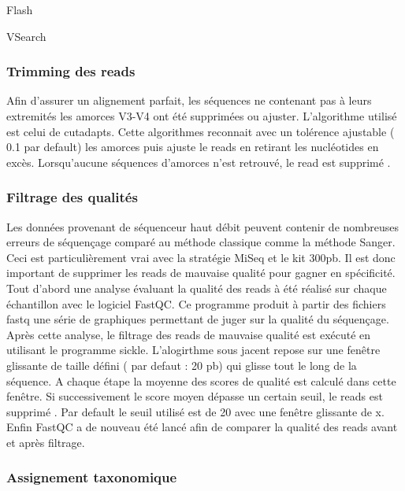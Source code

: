 \documentclass[12pt,a4paper]{article}
\begin{document}
Flash

VSearch

\subsubsection{Trimming des reads}

Afin d’assurer un alignement parfait, les séquences ne contenant pas à leurs extremités les amorces V3-V4 ont été supprimées ou ajuster.
L’algorithme utilisé est celui de cutadapts. Cette algorithmes reconnait avec un tolérence ajustable ( 0.1 par default) les amorces puis ajuste le reads en retirant les nucléotides en excès. Lorsqu’aucune séquences d’amorces n’est retrouvé, le read est supprimé .

\subsubsection{Filtrage des qualités}

Les données provenant de séquenceur haut débit peuvent contenir de nombreuses erreurs de séquençage comparé au méthode classique comme la méthode Sanger. Ceci est particulièrement vrai avec la stratégie MiSeq et le kit 300pb. Il est donc important de supprimer les reads de mauvaise qualité pour gagner en spécificité.
Tout d’abord une analyse évaluant la qualité des reads à été réalisé sur chaque échantillon avec le logiciel FastQC. Ce programme produit à partir des fichiers fastq une série de graphiques permettant de juger sur la qualité du séquençage.
Après cette analyse, le filtrage des reads de mauvaise qualité est exécuté en utilisant le programme sickle. L’alogirthme sous jacent repose sur une fenêtre glissante de taille défini ( par defaut : 20 pb) qui glisse tout le long de la séquence. A chaque étape la moyenne des scores de qualité est calculé dans cette fenêtre. Si successivement le score moyen dépasse un certain seuil, le reads est supprimé . Par default le seuil utilisé est de 20 avec une fenêtre glissante de x.
Enfin FastQC a de nouveau été lancé afin de comparer la qualité des reads avant et après filtrage.

\subsubsection{Assignement taxonomique}
\end{document}
